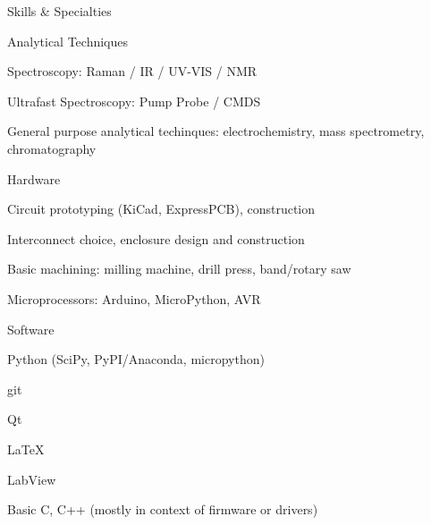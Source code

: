 \documentclass{resume}  %
\begin{document}
\begin{rSection}{Skills \& Specialties}
  \begin{rSubsection}{Analytical Techniques}{}{}{}
    \item Spectroscopy: Raman / IR / UV-VIS / NMR
    \item Ultrafast Spectroscopy: Pump Probe / CMDS
    \item General purpose analytical techinques: electrochemistry, mass spectrometry, chromatography
  \end{rSubsection}
  \begin{rSubsection}{Hardware}{}{}{}
    \item Circuit prototyping (KiCad, ExpressPCB), construction
    \item Interconnect choice, enclosure design and construction
    \item Basic machining: milling machine, drill press, band/rotary saw
    \item Microprocessors: Arduino, MicroPython, AVR
  \end{rSubsection}
  \begin{rSubsection}{Software}{}{}{}
    \item Python (SciPy, PyPI/Anaconda, micropython)
    \item git
    \item Qt
    \item LaTeX
    \item LabView
    \item Basic C, C++ (mostly in context of firmware or drivers)
  \end{rSubsection}
\end{rSection}

\clearpage
\end{document}
